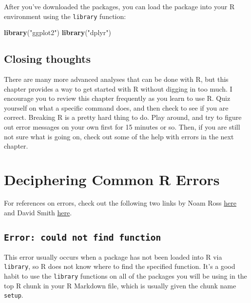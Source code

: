 \documentclass[]{tufte-book}
\newenvironment{Shaded}{\begin{snugshade}}{\end{snugshade}}
\newcommand{\KeywordTok}[1]{\textcolor[rgb]{0.13,0.29,0.53}{\textbf{#1}}}
\newcommand{\NormalTok}[1]{#1}
\newcommand{\StringTok}[1]{\textcolor[rgb]{0.31,0.60,0.02}{#1}}
\begin{document}
After you've downloaded the packages, you can load the package into your R environment using the \texttt{library} function:

\begin{Shaded}
\begin{Highlighting}[]
\KeywordTok{library}\NormalTok{(}\StringTok{"ggplot2"}\NormalTok{)}
\KeywordTok{library}\NormalTok{(}\StringTok{"dplyr"}\NormalTok{)}
\end{Highlighting}
\end{Shaded}

\hypertarget{closing-thoughts}{%
\section{Closing thoughts}\label{closing-thoughts}}

There are many more advanced analyses that can be done with R, but this chapter provides a way to get started with R without digging in too much. I encourage you to review this chapter frequently as you learn to use R. Quiz yourself on what a specific command does, and then check to see if you are correct. Breaking R is a pretty hard thing to do. Play around, and try to figure out error messages on your own first for 15 minutes or so. Then, if you are still not sure what is going on, check out some of the help with errors in the next chapter.

\hypertarget{errors}{%
\chapter{Deciphering Common R Errors}\label{errors}}

For references on errors, check out the following two links by Noam Ross \href{https://github.com/noamross/zero-dependency-problems/blob/master/misc/stack-overflow-common-r-errors.md}{here} and David Smith \href{http://blog.revolutionanalytics.com/2015/03/the-most-common-r-error-messages.html}{here}.

\hypertarget{error-could-not-find-function}{%
\section{\texorpdfstring{\texttt{Error:\ could\ not\ find\ function}}{Error: could not find function}}\label{error-could-not-find-function}}

This error usually occurs when a package has not been loaded into R via \texttt{library}, so R does not know where to find the specified function. It's a good habit to use the \texttt{library} functions on all of the packages you will be using in the top R chunk in your R Markdown file, which is usually given the chunk name \texttt{setup}.
\end{document}
